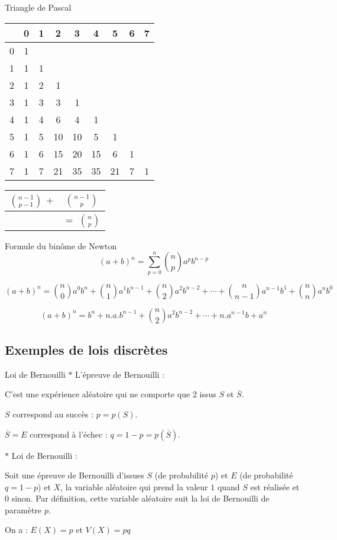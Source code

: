\begin{bclogo}{Triangle de Pascal}
\begin{center}
\begin{tabular}{|c|c|c|c|c|c|c|c|c|}
\hline
&0&1&2&3&4&5&6&7\\
\hline
0&1&&&&&&&\\
\hline
1&1&1&&&&&&\\
\hline
2&1&2&1&&&&&\\
\hline
3&1&3&3&1&&&&\\
\hline
4&1&4&6&4&1&&&\\
\hline
5&1&5&10&10&5&1&&\\
\hline
6&1&6&15&20&15&6&1&\\
\hline
7&1&7&21&35&35&21&7&1\\
\hline
\end{tabular}
\end{center}

\begin{center}
\begin{tabular}{|c|c|}
\hline
$\binom{n-1}{p-1}$ $+$&$\binom{n-1}{p}$\\
\hline
&$=$ $\binom{n}{p}$\\
\hline
\end{tabular}
\end{center}
\end{bclogo}

\medskip

\begin{bclogo}{Formule du binôme de Newton}
\[(a+b)^n=\sum _{p=0} ^{n} \binom{n}{p} a^p b^{n-p}\]

\[(a+b)^n =\binom{n}{0} a^0 b^n +\binom{n}{1} a^1 b^{n-1} + \binom{n}{2} a^2 b^{n-2}+\cdots+\binom{n}{n-1} a^{n-1} b^{1}+ \binom{n}{n} a^n b^{0}\]

\[(a+b)^n=b^n+n.a.b^{n-1}+\binom{n}{2} a^2 b^{n-2}+\cdots+n.a^{n-1}b+a^n\]
\end{bclogo}

\subsection{Exemples de lois discrètes}
\begin{bclogo}{Loi de Bernouilli}
$\ast$ L'épreuve de Bernouilli :

C'est une expérience aléatoire qui ne comporte que 2 issus $S$ et $\overline{S}$.

$S$ correspond au succès : $p=p(S)$.

$\overline{S} =E$ correspond à l'échec : $q=1-p=p(\overline{S})$.

$\ast$ Loi de Bernouilli : 

Soit une épreuve de Bernouilli d'issues $S$ (de probabilité $p$) et $E$ (de probabilité $q=1-p$) et $X$, la variable aléatoire qui prend la valeur $1$ quand $S$ est réalisée et $0$ sinon. Par définition, cette variable aléatoire suit la loi de Bernouilli de paramètre $p$. 

On a : $E(X)=p$ et $V(X)=pq$
\end{bclogo}

